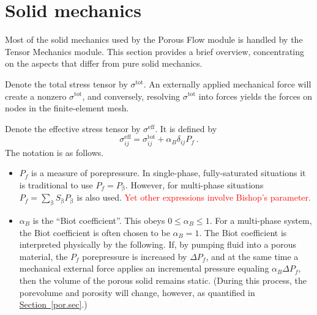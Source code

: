 \documentclass[12pt]{report}
\def\phase{\mathrm{\beta}}
\begin{document}
\section{Solid mechanics}

Most of the solid mechanics used by the Porous Flow module is handled
by the Tensor Mechanics module.  This section provides a brief
overview, concentrating on the aspects that differ from pure solid
mechanics.

Denote the total stress tensor by $\sigma^{\mathrm{tot}}$.  An
externally applied mechanical force will create a nonzero
$\sigma^{\mathrm{tot}}$, and conversely, resolving
$\sigma^{\mathrm{tot}}$ into forces yields the forces on nodes in the
finite-element mesh.

Denote the effective stress tensor by $\sigma^{\mathrm{eff}}$.  It is
defined by
\begin{equation}
\sigma^{\mathrm{eff}}_{ij} = \sigma^{\mathrm{tot}}_{ij} +
\alpha_{B}\delta_{ij}P_{f} \ .
\label{eff.stress.eqn}
\end{equation}
The notation is as follows.
\begin{itemize}
\item $P_{f}$ is a measure of porepressure.  In single-phase,
  fully-saturated situations it is traditional to use $P_{f} =
  P_{\phase}$.  However, for multi-phase situations
  $P_{f}=\sum_{\phase}S_{\phase}P_{\phase}$ is also used.  \textcolor{red}{Yet other
  expressions involve Bishop's parameter.}
\item $\alpha_{B}$ is the ``Biot coefficient''.  This obeys
  $0\leq\alpha_{B}\leq 1$. For a multi-phase system, the Biot
  coefficient is often chosen to be $\alpha_{B}=1$. The Biot
  coefficient is interpreted physically by the following. If, by
  pumping fluid into a porous material, the $P_{f}$ porepressure is
  increased by $\Delta P_{f}$, and at the same time a mechanical
  external force applies an incremental pressure equaling
  $\alpha_{B}\Delta P_{f}$, then the volume of the porous solid
  remains static. (During this process, the porevolume and porosity
  will change, however, as quantified in
  \hyperref[por.sec]{Section~\ref*{por.sec}}.)
\end{itemize}
\end{document}
